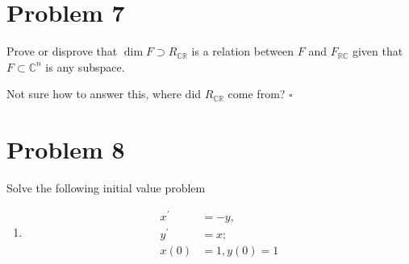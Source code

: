\documentclass[11pt]{article}
\newcommand{\C}{\mathbb{C}}
\newcommand{\R}{\mathbb{R}}
\newenvironment{proof}{\noindent{\bf Proof.}}{\hfill $\square$\medskip}
\begin{document}
\section{Problem 7}
Prove or disprove that $\dim F\supset R_{\C\R}$ is a relation between $F$ and $F_{\R\C}$
given that $F\subset \C^{n}$ is any subspace.

\begin{proof}
Not sure how to answer this, where did $R_{\C\R}$ come from?
\end{proof}

\section{Problem 8}
Solve the following initial value problem
\begin{enumerate}[label=(\alph*)]
    \item \begin{equation}
              \begin{split}
                  x^{\prime}&=-y,\\
                  y^{\prime}&=x;\\
                  x(0)&=1,y(0)=1
              \end{split}
          \end{equation}
\end{enumerate}
\end{document}

